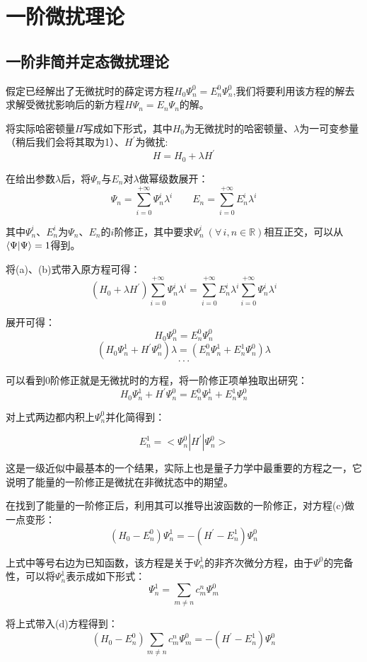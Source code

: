 \section{一阶微扰理论}
\subsection{一阶非简并定态微扰理论}
假定已经解出了无微扰时的薛定谔方程$H_0 \varPsi_n^0 =E_n^0 \varPsi_n^0$,我们将要利用该方程的解去求解受微扰影响后的新方程$H \varPsi_n =E_n \varPsi_n$的解。

将实际哈密顿量$H$写成如下形式，其中$H_0$为无微扰时的哈密顿量、$\lambda$为一可变参量（稍后我们会将其取为1）、$H^{'}$为微扰:
\[H=H_0+\lambda H^{'} \tag{a}\]

在给出参数$\lambda$后，将$\varPsi_n$与$E_n$对$\lambda$做幂级数展开：
\[\varPsi_n=\sum_{i=0}^{+\infty}\varPsi_n^i\lambda^i \qquad E_n=\sum_{i=0}^{+\infty}E_n^i\lambda^i \tag{b}\]

其中$\varPsi_n^i$、$E_n^i$为$\varPsi_n$、$E_n$的$i$阶修正，其中要求$\varPsi_n^i \ (\forall \, i,n \in \mathbb{R})$相互正交，可以从$\bra{\Psi}\ket{\Psi}=1$得到。

将(a)、(b)式带入原方程可得：
\[(H_0+\lambda H^{'})\sum_{i=0}^{+\infty}\varPsi_n^i\lambda^i=\sum_{i=0}^{+\infty}E_n^i\lambda^i\sum_{i=0}^{+\infty}\varPsi_n^i\lambda^i\]

展开可得：
\[H_0 \varPsi_n^0=E_n^0 \varPsi_n^0\]
\[(H_0 \varPsi_n^1+H^{'} \varPsi_n^0)\lambda=(E_n^0 \varPsi_n^1+E_n^1 \varPsi_n^0)\lambda\]
\[\cdot\cdot\cdot\]

可以看到0阶修正就是无微扰时的方程，将一阶修正项单独取出研究：
\[H_0 \varPsi_n^1+H^{'} \varPsi_n^0=E_n^0 \varPsi_n^1+E_n^1 \varPsi_n^0 \tag{c}\]

对上式两边都内积上$\varPsi_n^0$并化简得到：

\[E_n^1=<\varPsi_n^0|H^{'}|\varPsi_n^0>\]

这是一级近似中最基本的一个结果，实际上也是量子力学中最重要的方程之一，它说明了能量的一阶修正是微扰在非微扰态中的期望。

在找到了能量的一阶修正后，利用其可以推导出波函数的一阶修正，对方程(c)做一点变形：
\[(H_0-E_n^0) \varPsi_n^1=-(H^{'}-E_n^1) \varPsi_n^0 \tag{d}\]

上式中等号右边为已知函数，该方程是关于$\varPsi_n^1$的非齐次微分方程，由于$\varPsi^0$的完备性，可以将$\varPsi_n^1$表示成如下形式：
\[\varPsi_n^1=\sum_{m \neq n}c_m^n\varPsi_m^0 \tag{e}\]

将上式带入(d)方程得到：
\[(H_0-E_n^0) \sum_{m \neq n}c_m^n\varPsi_m^0=-(H^{'}-E_n^1) \varPsi_n^0\]

